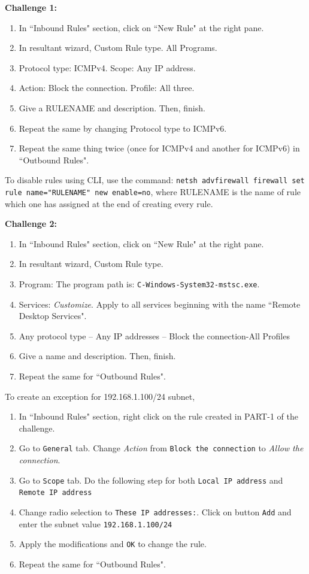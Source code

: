 \documentclass[12pt]{extarticle}
\begin{document}
\item \textbf{Challenge 1:}
\begin{enumerate}
\item In ``Inbound Rules" section, click on ``New Rule" at the right pane. 
\item In resultant wizard, Custom Rule type. All Programs.
\item Protocol type: ICMPv4. Scope: Any IP address.
\item Action: Block the connection. Profile: All three.
\item Give a RULENAME and description. Then, finish.
\item Repeat the same by changing Protocol type to ICMPv6.
\item Repeat the same thing twice (once for ICMPv4 and another for ICMPv6) in ``Outbound Rules".  
\end{enumerate}

\noindent
To disable rules using CLI, use the command: \texttt{netsh advfirewall firewall set rule name="RULENAME" new enable=no}, where RULENAME is the name of rule which one has assigned at the end of creating every rule. 
 

\vspace{4mm}
\item \textbf{Challenge 2:}
\begin{enumerate}
\item In ``Inbound Rules" section, click on ``New Rule" at the right pane. 
\item In resultant wizard, Custom Rule type. 
\item Program: The program path is: \texttt{C-Windows-System32-mstsc.exe}.
\item Services: \textit{Customize}. Apply to all services beginning with the name ``Remote Desktop Services".
\item Any protocol type -- Any IP addresses -- Block the connection-All Profiles
\item Give a name and description. Then, finish.
\item Repeat the same for ``Outbound Rules".
\end{enumerate}

\noindent
To create an exception for 192.168.1.100/24 subnet, 

\begin{enumerate}
\item In ``Inbound Rules" section, right click on the rule created in PART-1 of the challenge.  
\item Go to \texttt{General} tab. Change \textit{Action} from \texttt{Block the connection} to \textit{Allow the connection}.
\item Go to \texttt{Scope} tab. Do the following step for both \texttt{Local IP address} and \texttt{Remote IP address}
\item Change radio selection to \texttt{These IP addresses:}. Click on button \texttt{Add} and enter the subnet value \texttt{192.168.1.100/24}
\item Apply the modifications and \texttt{OK} to change the rule.
\item Repeat the same for ``Outbound Rules".
\end{enumerate}
\end{document}
